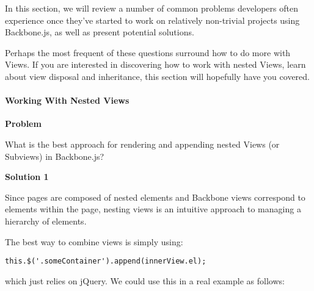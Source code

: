 \documentclass[9pt]{book}
\newenvironment{Shaded}{}{}
\newcommand{\KeywordTok}[1]{\textcolor[rgb]{0.00,0.44,0.13}{\textbf{{#1}}}}
\newcommand{\StringTok}[1]{\textcolor[rgb]{0.25,0.44,0.63}{{#1}}}
\newcommand{\CommentTok}[1]{\textcolor[rgb]{0.38,0.63,0.69}{\textit{{#1}}}}
\newcommand{\OtherTok}[1]{\textcolor[rgb]{0.00,0.44,0.13}{{#1}}}
\newcommand{\FunctionTok}[1]{\textcolor[rgb]{0.02,0.16,0.49}{{#1}}}
\newcommand{\NormalTok}[1]{{#1}}
\begin{document}
In this section, we will review a number of common problems developers
often experience once they've started to work on relatively non-trivial
projects using Backbone.js, as well as present potential solutions.

Perhaps the most frequent of these questions surround how to do more
with Views. If you are interested in discovering how to work with nested
Views, learn about view disposal and inheritance, this section will
hopefully have you covered.

\paragraph{Working With Nested Views}\label{working-with-nested-views}

\textbf{Problem}

What is the best approach for rendering and appending nested Views (or
Subviews) in Backbone.js?

\textbf{Solution 1}

Since pages are composed of nested elements and Backbone views
correspond to elements within the page, nesting views is an intuitive
approach to managing a hierarchy of elements.

The best way to combine views is simply using:

\begin{verbatim}
this.$('.someContainer').append(innerView.el);
\end{verbatim}

which just relies on jQuery. We could use this in a real example as
follows:

\begin{Shaded}
\end{Shaded}
\end{document}
